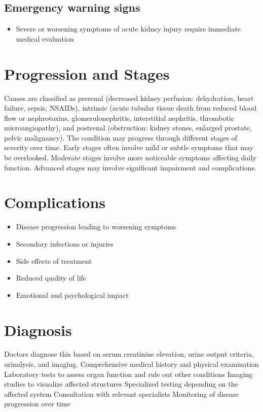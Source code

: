 \subsection{Emergency warning signs}
\begin{itemize}[noitemsep]
  \item Severe or worsening symptoms of acute kidney injury require immediate medical evaluation
\end{itemize}
\section{Progression and Stages}
Causes are classified as prerenal (decreased kidney perfusion: dehydration, heart failure, sepsis, NSAIDs), intrinsic (acute tubular tissue death from reduced blood flow or nephrotoxins, glomerulonephritis, interstitial nephritis, thrombotic microangiopathy), and postrenal (obstruction: kidney stones, enlarged prostate, pelvic malignancy). The condition may progress through different stages of severity over time. Early stages often involve mild or subtle symptoms that may be overlooked. Moderate stages involve more noticeable symptoms affecting daily function. Advanced stages may involve significant impairment and complications.
\section{Complications}
\begin{itemize}[noitemsep]
  \item Disease progression leading to worsening symptoms
  \item Secondary infections or injuries
  \item Side effects of treatment
  \item Reduced quality of life
  \item Emotional and psychological impact
\end{itemize}
\section{Diagnosis}
Doctors diagnose this based on serum creatinine elevation, urine output criteria, urinalysis, and imaging. Comprehensive medical history and physical examination Laboratory tests to assess organ function and rule out other conditions Imaging studies to visualize affected structures Specialized testing depending on the affected system Consultation with relevant specialists Monitoring of disease progression over time


